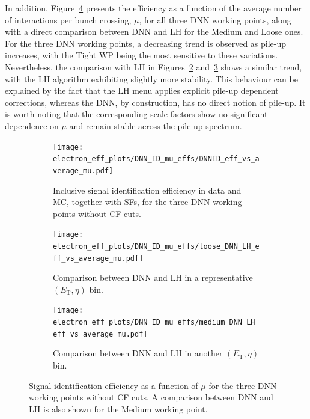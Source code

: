 In addition, Figure~\ref{fig:eff_sfs_dnn_vs_lh_mu} presents the efficiency as a function of the average number of interactions per bunch crossing, $\mu$, for all three DNN working points, along with a direct comparison between DNN and LH for the Medium and Loose ones. For the three DNN working points, a decreasing trend is observed as pile-up increases, with the Tight WP being the most sensitive to these variations. Nevertheless, the comparison with LH in Figures~\ref{fig:eff_sfs_dnn_vs_lh_loose_mu} and~\ref{fig:eff_sfs_dnn_vs_lh_medium_mu} shows a similar trend, with the LH algorithm exhibiting slightly more stability. This behaviour can be explained by the fact that the LH menu applies explicit pile-up dependent corrections, whereas the DNN, by construction, has no direct notion of pile-up.
It is worth noting that the corresponding scale factors show no significant dependence on $\mu$ and remain stable across the pile-up spectrum.
\begin{figure}[htbp]
  \centering
  \begin{subfigure}{0.70\textwidth}
    \centering
    \texttt{[image: electron\_eff\_plots/DNN\_ID\_mu\_effs/DNNID\_eff\_vs\_average\_mu.pdf]}
    \caption{Inclusive signal identification efficiency in data and MC, together with SFs, for the three DNN working points without CF cuts.}
    \label{fig:eff_sfs_dnn_mu}
  \end{subfigure}

  \vspace{0.6cm}

  \begin{subfigure}{0.48\textwidth}
    \centering
    \texttt{[image: electron\_eff\_plots/DNN\_ID\_mu\_effs/loose\_DNN\_LH\_eff\_vs\_average\_mu.pdf]}
    \caption{Comparison between DNN and LH in a representative $(E_{\mathrm{T}},\eta)$ bin.}
    \label{fig:eff_sfs_dnn_vs_lh_loose_mu}
  \end{subfigure}
  \hfill
  \begin{subfigure}{0.48\textwidth}
    \centering
    \texttt{[image: electron\_eff\_plots/DNN\_ID\_mu\_effs/medium\_DNN\_LH\_eff\_vs\_average\_mu.pdf]}
    \caption{Comparison between DNN and LH in another $(E_{\mathrm{T}},\eta)$ bin.}
    \label{fig:eff_sfs_dnn_vs_lh_medium_mu}
  \end{subfigure}

  \caption{Signal identification efficiency as a function of $\mu$ for the three DNN working points without CF cuts. A comparison between DNN and LH is also shown for the Medium working point.}
  \label{fig:eff_sfs_dnn_vs_lh_mu}
\end{figure}

